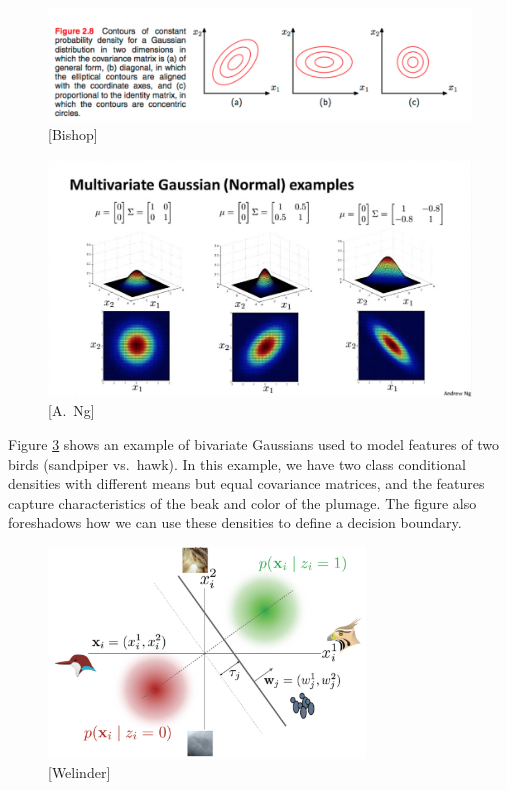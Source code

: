 \documentclass[a4paper]{article}
\begin{document}
\begin{figure}
\centering
\includegraphics[width=1.0\textwidth]{gaussian_contours.png}
\caption{\label{fig:gaussian_contours}[Bishop]}
\end{figure}

\begin{figure}
\centering
\includegraphics[width=1.0\textwidth]{gaussian_heatmap.png}
\caption{\label{fig:gaussian_heatmap}[A.\ Ng]}
\end{figure}


Figure \ref{fig:birdspace} shows an example of bivariate Gaussians used to model features of two birds (sandpiper vs.\ hawk).  In this example, we have two class conditional densities with different means but equal covariance matrices, and the features capture characteristics of the beak and color of the plumage.  The figure also foreshadows how we can use these densities to define a decision boundary.

\begin{figure}
\centering
\includegraphics[width=0.75\textwidth]{welinder2010.jpg}
\caption{\label{fig:birdspace}[Welinder]}
\end{figure}
\end{document}
